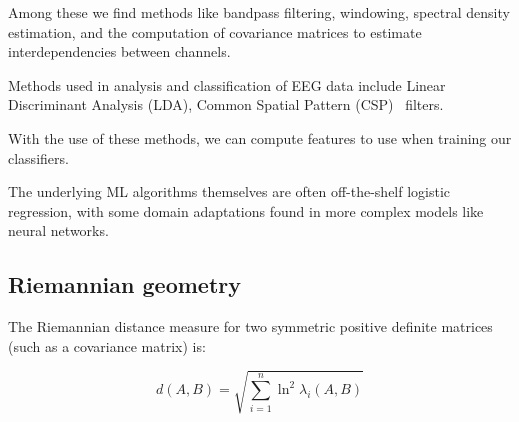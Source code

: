     Among these we find methods like bandpass filtering, windowing, spectral density estimation, and the computation of covariance matrices to estimate interdependencies between channels.

    Methods used in analysis and classification of EEG data include Linear Discriminant Analysis (LDA), Common Spatial Pattern (CSP)~\cite{barachant_common_2010} filters.

    With the use of these methods, we can compute features to use when training our classifiers.

    The underlying ML algorithms themselves are often off-the-shelf logistic regression, with some domain adaptations found in more complex models like neural networks.


    \subsection{Riemannian geometry}\label{section:riemannian-theory}


        The Riemannian distance measure for two symmetric positive definite matrices (such as a covariance matrix) is:~\cite{grafarend_metric_2003}

        \[ d(A, B) = \sqrt{\sum_{i=1}^{n} \ln^2 \lambda_i (A, B) } \]

